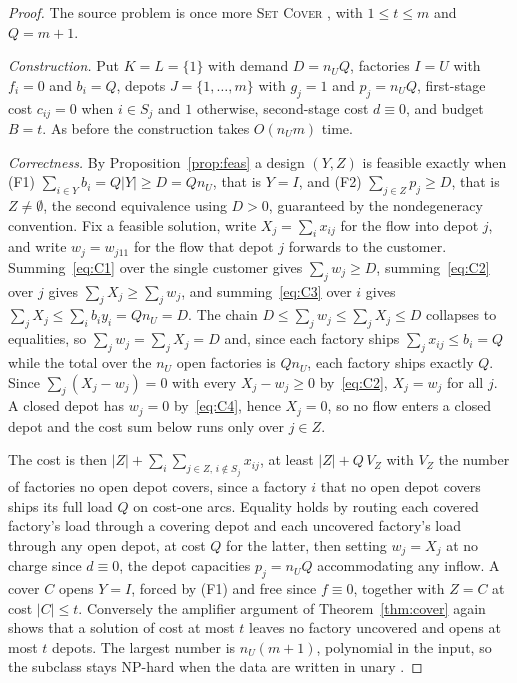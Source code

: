 \begin{proof}
The source problem is once more \textsc{Set Cover} \citep{Karp1972},
with $1\le t\le m$ and
$Q=m+1$.

\emph{Construction.} Put $K=L=\{1\}$ with demand $D=n_U Q$, factories
$I=U$ with $f_i=0$ and $b_i=Q$, depots $J=\{1,\dots,m\}$ with $g_j=1$ and
$p_j=n_U Q$, first-stage cost $c_{ij}=0$ when $i\in S_j$ and $1$
otherwise, second-stage cost $d\equiv 0$, and budget $B=t$. As before
the construction takes $O(n_U m)$ time.

\emph{Correctness.} By Proposition~\ref{prop:feas} a design $(Y,Z)$ is
feasible exactly when (F1) $\sum_{i\in Y}b_i=Q|Y|\ge D=Qn_U$, that is
$Y=I$, and (F2) $\sum_{j\in Z}p_j\ge D$, that is $Z\ne\emptyset$, the
second equivalence using $D>0$, guaranteed by the nondegeneracy
convention. Fix a
feasible solution, write $X_j=\sum_i x_{ij}$ for the flow into depot
$j$, and write $w_j=w_{j11}$ for the flow that depot $j$ forwards to the
customer. Summing~\eqref{eq:C1} over the single customer gives $\sum_j w_j\ge D$,
summing~\eqref{eq:C2} over $j$ gives $\sum_j X_j\ge\sum_j w_j$, and
summing~\eqref{eq:C3} over $i$ gives $\sum_j X_j\le\sum_i b_i y_i=Qn_U=D$.
The chain $D\le\sum_j w_j\le\sum_j X_j\le D$ collapses to equalities, so
$\sum_j w_j=\sum_j X_j=D$ and, since each factory ships $\sum_j x_{ij}\le
b_i=Q$ while the total over the $n_U$ open factories is $Qn_U$, each
factory ships exactly $Q$. Since $\sum_j (X_j-w_j)=0$ with every
$X_j-w_j\ge 0$ by~\eqref{eq:C2}, $X_j=w_j$ for all $j$. A closed depot
has $w_j=0$ by~\eqref{eq:C4}, hence $X_j=0$, so no flow enters a closed
depot and the cost sum below runs only over $j\in Z$.

The cost is then
$|Z|+\sum_i\sum_{j\in Z,\,i\notin S_j}x_{ij}$, at least $|Z|+Q\,V_Z$
with $V_Z$ the number of factories no open depot covers, since a factory
$i$ that no open depot covers ships its full load $Q$ on cost-one arcs.
Equality holds by routing each covered factory's load through a covering
depot and each uncovered factory's load through any open depot, at cost
$Q$ for the latter, then setting $w_j=X_j$ at no charge since
$d\equiv 0$, the depot capacities $p_j=n_UQ$ accommodating any inflow.
A cover $C$ opens $Y=I$, forced by (F1) and free since $f\equiv 0$,
together with
$Z=C$ at cost $|C|\le t$. Conversely the amplifier argument of
Theorem~\ref{thm:cover} again shows that a solution of cost at most $t$
leaves no factory uncovered and opens at most $t$ depots. The largest
number is $n_U(m+1)$, polynomial in the input, so the subclass stays
NP-hard when the data are written in unary \citep{GareyJohnson1979}.
\end{proof}

